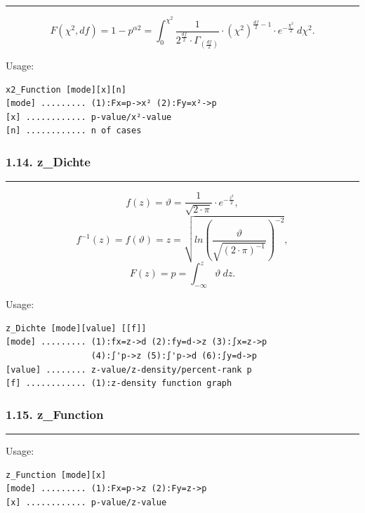 \documentclass[
]{article}
\begin{document}
\begin{center}\rule{0.5\linewidth}{0.5pt}\end{center}

\[F\left( \chi^{2},df \right) = 1 - p^{\alpha 2} = \int_{0}^{\chi^{2}}\frac{1}{2^{\frac{df}{2}} \cdot \Gamma_{\left( \frac{df}{2} \right)}} \cdot \left( \chi^{2} \right)^{\frac{df}{2} - 1} \cdot e^{- \frac{\chi^{2}}{2}}\ d\chi^{2}.\]

Usage:

\begin{verbatim}
x2_Function [mode][x][n]
[mode] ......... (1):Fx=p->x² (2):Fy=x²->p
[x] ............ p-value/x²-value
[n] ............ n of cases
\end{verbatim}

\hypertarget{z_dichte}{%
\subsubsection{1.14. z\_Dichte}\label{z_dichte}}

\begin{center}\rule{0.5\linewidth}{0.5pt}\end{center}

\[f(z) = \vartheta = \frac{1}{\sqrt{2 \cdot \pi}} \cdot e^{- \frac{z^{2}}{2}},\]
\[f^{- 1}(z) = f(\vartheta) = z = \sqrt{ln(\frac{\vartheta}{\sqrt{(2 \cdot \pi)^{- 1}}})^{- 2}},\]
\[F(z) = p = \int_{- \infty}^{z}\vartheta\ dz.\]

Usage:

\begin{verbatim}
z_Dichte [mode][value] [[f]]
[mode] ......... (1):fx=z->d (2):fy=d->z (3):∫x=z->p
                 (4):∫'p->z (5):∫'p->d (6):∫y=d->p
[value] ........ z-value/z-density/percent-rank p
[f] ............ (1):z-density function graph
\end{verbatim}

\hypertarget{z_function}{%
\subsubsection{1.15. z\_Function}\label{z_function}}

\begin{center}\rule{0.5\linewidth}{0.5pt}\end{center}

Usage:

\begin{verbatim}
z_Function [mode][x]
[mode] ......... (1):Fx=p->z (2):Fy=z->p
[x] ............ p-value/z-value
\end{verbatim}
\end{document}
